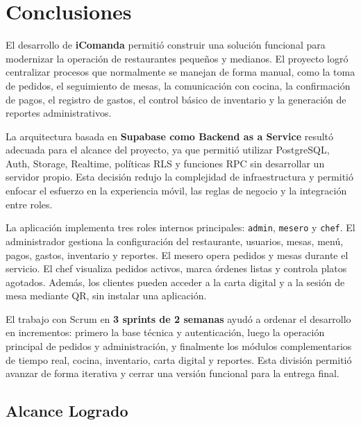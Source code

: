 \chapter{Conclusiones}

El desarrollo de \textbf{iComanda} permitió construir una solución funcional para
modernizar la operación de restaurantes pequeños y medianos. El proyecto logró
centralizar procesos que normalmente se manejan de forma manual, como la toma de
pedidos, el seguimiento de mesas, la comunicación con cocina, la confirmación de
pagos, el registro de gastos, el control básico de inventario y la generación de
reportes administrativos.

La arquitectura basada en \textbf{Supabase como Backend as a Service} resultó adecuada
para el alcance del proyecto, ya que permitió utilizar PostgreSQL, Auth, Storage,
Realtime, políticas RLS y funciones RPC sin desarrollar un servidor propio. Esta
decisión redujo la complejidad de infraestructura y permitió enfocar el esfuerzo en
la experiencia móvil, las reglas de negocio y la integración entre roles.

La aplicación implementa tres roles internos principales: \texttt{admin},
\texttt{mesero} y \texttt{chef}. El administrador gestiona la configuración del
restaurante, usuarios, mesas, menú, pagos, gastos, inventario y reportes. El mesero
opera pedidos y mesas durante el servicio. El chef visualiza pedidos activos, marca
órdenes listas y controla platos agotados. Además, los clientes pueden acceder a la
carta digital y a la sesión de mesa mediante QR, sin instalar una aplicación.

El trabajo con Scrum en \textbf{3 sprints de 2 semanas} ayudó a ordenar el desarrollo
en incrementos: primero la base técnica y autenticación, luego la operación principal
de pedidos y administración, y finalmente los módulos complementarios de tiempo real,
cocina, inventario, carta digital y reportes. Esta división permitió avanzar de forma
iterativa y cerrar una versión funcional para la entrega final.

\section{Alcance Logrado}

